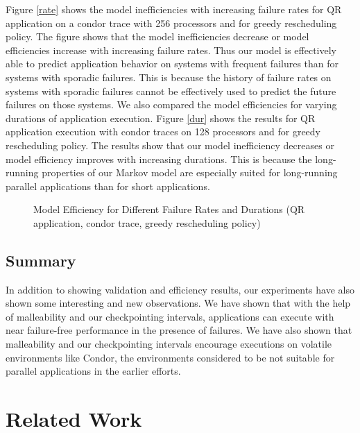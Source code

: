 \documentclass[conference,10pt]{IEEEtran}
\begin{document}
Figure \ref{rate} shows the model inefficiencies with increasing
failure rates for QR application on a condor trace with 256 processors
and for greedy rescheduling policy. The figure shows that the model
inefficiencies decrease or model efficiencies increase with increasing
failure rates. Thus our model is effectively able to predict
application behavior on systems with frequent failures than for
systems with sporadic failures. This is because the history of failure
rates on systems with sporadic failures cannot be effectively used to
predict the future failures on those systems. We also compared the
model efficiencies for varying durations of application
execution. Figure \ref{dur} shows the results for QR application
execution with condor traces on 128 processors and for greedy
rescheduling policy. The results show that our model inefficiency
decreases or model efficiency improves with increasing durations. This
is because the long-running properties of our Markov model are
especially suited for long-running parallel applications than for
short applications.

\begin{figure}
\centering
{}
\hfil
{}
\caption{Model Efficiency for Different Failure Rates and Durations (QR application,
  condor trace, greedy rescheduling policy)}
\label{rate-dur}
\end{figure}

\subsection{Summary}

In addition to showing validation and efficiency results, our
experiments have also shown some interesting and new observations. We
have shown that with the help of malleability and our checkpointing
intervals, applications can execute with near failure-free performance
in the presence of failures. We have also shown that malleability and
our checkpointing intervals encourage executions on volatile
environments like Condor, the environments considered to be not
suitable for parallel applications in the earlier efforts.

\section{Related Work}
\label{related}
\end{document}
